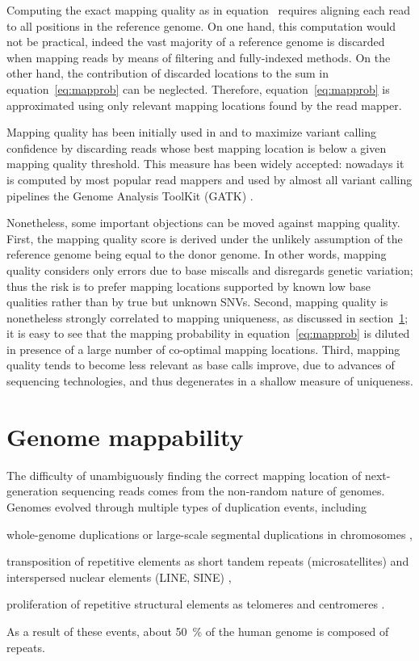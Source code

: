 Computing the exact mapping quality as in equation~\label{eq:mapqual} requires aligning each read to all positions in the reference genome.
On one hand, this computation would not be practical, indeed the vast majority of a reference genome is discarded when mapping reads by means of filtering and fully-indexed methods.
On the other hand, the contribution of discarded locations to the sum in equation~\ref{eq:mapprob} can be neglected.
Therefore, equation~\ref{eq:mapprob} is approximated using only relevant mapping locations found by the read mapper.

Mapping quality has been initially used in \citep{Li2008} and \citep{Li2009} to maximize variant calling confidence by discarding reads whose best mapping location is below a given mapping quality threshold.
This measure has been widely accepted: nowadays it is computed by most popular read mappers and used by almost all variant calling pipelines \eg the Genome Analysis ToolKit (GATK) \citep{DePristo2011}.

Nonetheless, some important objections can be moved against mapping quality.
First, the mapping quality score is derived under the unlikely assumption of the reference genome being equal to the donor genome.
In other words, mapping quality considers only errors due to base miscalls and disregards genetic variation; thus the risk is to prefer mapping locations supported by known low base qualities rather than by true but unknown SNVs.
Second, mapping quality is nonetheless strongly correlated to mapping uniqueness, as discussed in section~\ref{sec:mappability}; it is easy to see that the mapping probability in equation~\ref{eq:mapprob} is diluted in presence of a large number of co-optimal mapping locations.
Third, mapping quality tends to become less relevant as base calls improve, due to advances of sequencing technologies, and thus degenerates in a shallow measure of uniqueness.


\section{Genome mappability}
\label{sec:mappability}

The difficulty of unambiguously finding the correct mapping location of next-generation sequencing reads comes from the non-random nature of genomes.
Genomes evolved through multiple types of duplication events, including
\begin{inparaenum}[(i)]
\item whole-genome duplications \citep{?} or large-scale segmental duplications in chromosomes \citep{?},
\item transposition of repetitive elements as short tandem repeats (microsatellites) and interspersed nuclear elements (LINE, SINE) \citep{?},
\item proliferation of repetitive structural elements as telomeres and centromeres \citep{?}.
\end{inparaenum}
As a result of these events, about 50~\% of the human genome is composed of repeats.

